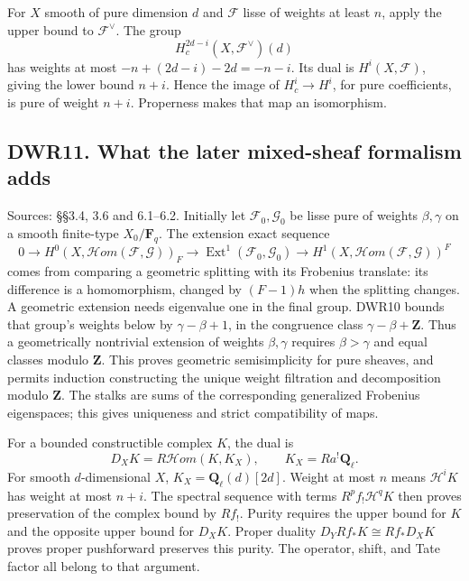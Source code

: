 For \(X\) smooth of pure dimension \(d\) and \(\mathcal F\) lisse of
weights at least \(n\), apply the upper bound to \(\mathcal F^\vee\).
The group \[
H_c^{2d-i}(X,\mathcal F^\vee)(d)
\tag{DWR10.2}
\] has weights at most \(-n+(2d-i)-2d=-n-i\). Its dual is
\(H^i(X,\mathcal F)\), giving the lower bound \(n+i\). Hence the image
of \(H_c^i\to H^i\), for pure coefficients, is pure of weight \(n+i\).
Properness makes that map an isomorphism.

\subsection{DWR11. What the later mixed-sheaf formalism
adds}\label{dwr11.-what-the-later-mixed-sheaf-formalism-adds}

Sources: §§3.4, 3.6 and 6.1--6.2. Initially let
\(\mathcal F_0,\mathcal G_0\) be lisse pure of weights \(\beta,\gamma\)
on a smooth finite-type \(X_0/\mathbf F_q\). The extension exact
sequence \[
0\to H^0(X,\mathcal Hom(\mathcal F,\mathcal G))_F
\to\operatorname{Ext}^1(\mathcal F_0,\mathcal G_0)
\to H^1(X,\mathcal Hom(\mathcal F,\mathcal G))^F
\tag{DWR11.1}
\] comes from comparing a geometric splitting with its Frobenius
translate: its difference is a homomorphism, changed by \((F-1)h\) when
the splitting changes. A geometric extension needs eigenvalue one in the
final group. DWR10 bounds that group's weights below by
\(\gamma-\beta+1\), in the congruence class \(\gamma-\beta+\mathbf Z\).
Thus a geometrically nontrivial extension of weights \(\beta,\gamma\)
requires \(\beta>\gamma\) and equal classes modulo \(\mathbf Z\). This
proves geometric semisimplicity for pure sheaves, and permits induction
constructing the unique weight filtration and decomposition modulo
\(\mathbf Z\). The stalks are sums of the corresponding generalized
Frobenius eigenspaces; this gives uniqueness and strict compatibility of
maps.

For a bounded constructible complex \(K\), the dual is \[
D_XK=R\mathcal Hom(K,K_X),\qquad K_X=Ra^!\mathbf Q_\ell.
\tag{DWR11.2}
\] For smooth \(d\)-dimensional \(X\), \(K_X=\mathbf Q_\ell(d)[2d]\).
Weight at most \(n\) means \(\mathcal H^iK\) has weight at most \(n+i\).
The spectral sequence with terms \(R^pf_!\mathcal H^qK\) then proves
preservation of the complex bound by \(Rf_!\). Purity requires the upper
bound for \(K\) and the opposite upper bound for \(D_XK\). Proper
duality \(D_YRf_*K\cong Rf_*D_XK\) proves proper pushforward preserves
this purity. The operator, shift, and Tate factor all belong to that
argument.

